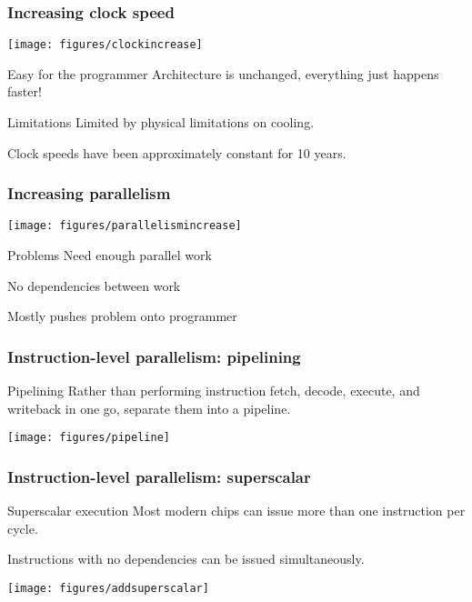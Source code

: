 \documentclass[presentation,aspectratio=43,10pt]{beamer}
\begin{document}
\begin{frame}
  \frametitle{Increasing clock speed}
  \begin{center}
    \texttt{[image: figures/clockincrease]}
  \end{center}

  \begin{answer}{Easy for the programmer}
    Architecture is unchanged, everything just happens faster!
  \end{answer}
  \begin{challenge}{Limitations}
    Limited by physical limitations on cooling.

    Clock speeds have been approximately constant for 10 years.
  \end{challenge}
\end{frame}

\begin{frame}
  \frametitle{Increasing parallelism}
  \begin{center}
    \texttt{[image: figures/parallelismincrease]}
  \end{center}

  \begin{challenge}{Problems}
    Need enough parallel work

    No dependencies between work

    Mostly pushes problem onto programmer
  \end{challenge}
\end{frame}

\begin{frame}
  \frametitle{Instruction-level parallelism: pipelining}
  \begin{block}{Pipelining}
    Rather than performing instruction fetch, decode, execute, and
    writeback in one go, separate them into a pipeline.
  \end{block}
  \begin{center}
    \texttt{[image: figures/pipeline]}
  \end{center}
\end{frame}

\begin{frame}
  \frametitle{Instruction-level parallelism: superscalar}
  \begin{block}{Superscalar execution}
    Most modern chips can issue more than one instruction per cycle.

    Instructions with no dependencies can be issued simultaneously.
  \end{block}
  \begin{center}
    \texttt{[image: figures/addsuperscalar]}
  \end{center}
\end{frame}
\end{document}
